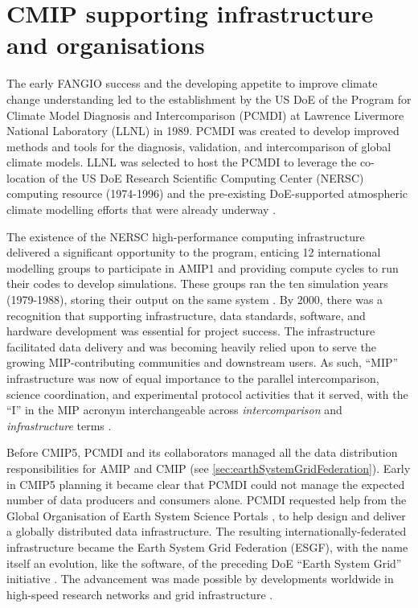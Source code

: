 \documentclass[manuscript]{copernicus}
\begin{document}
\section{CMIP supporting infrastructure and organisations}
\label{sec:CMIPSupportingOrgsAndInfra}

The early FANGIO success and the developing appetite to improve climate change understanding led to the establishment by the US DoE of the Program for Climate Model Diagnosis and Intercomparison (PCMDI) at Lawrence Livermore National Laboratory (LLNL) in 1989. PCMDI was created to develop improved methods and tools for the diagnosis, validation, and intercomparison of global climate models. LLNL was selected to host the PCMDI to leverage the co-location of the US DoE Research Scientific Computing Center (NERSC) computing resource (1974-1996) and the pre-existing DoE-supported atmospheric climate modelling efforts that were already underway \citep[e.g.,][]{maccracken_projecting_1985,potter_celebrating_2011}.

The existence of the NERSC high-performance computing infrastructure delivered a significant opportunity to the program, enticing 12 international modelling groups to participate in AMIP1 and providing compute cycles to run their codes to develop simulations. These groups ran the ten simulation years (1979-1988), storing their output on the same system \citep{gates_amip_1991, gates_amip_1992}. By 2000, there was a recognition that supporting infrastructure, data standards, software, and hardware development was essential for project success. The infrastructure facilitated data delivery and was becoming heavily relied upon to serve the growing MIP-contributing communities and downstream users. As such, ``MIP'' infrastructure was now of equal importance to the parallel intercomparison, science coordination, and experimental protocol activities that it served, with the ``I'' in the MIP acronym interchangeable across \textit{intercomparison} and \emph{infrastructure} terms \citep{gleckler_amip_2001}.

Before CMIP5, PCMDI and its collaborators managed all the data distribution responsibilities for AMIP and CMIP (see \autoref{sec:earthSystemGridFederation}). Early in CMIP5 planning it became clear that PCMDI could not manage the expected number of data producers and consumers alone. PCMDI requested help from the Global Organisation of Earth System Science Portals \citep[GO-ESSP; see][]{williams_earth_2009}, to help design and deliver a globally distributed data infrastructure. The resulting internationally-federated infrastructure became the Earth System Grid Federation (ESGF), with the name itself an evolution, like the software, of the preceding DoE ``Earth System Grid'' initiative \citep[see \autoref{sec:earthSystemGridFederation};][]{williams_earth_2009}.
The advancement was made possible by developments worldwide in high-speed research networks and grid infrastructure \citep{baxevanidis_grids_2002}.
\end{document}
